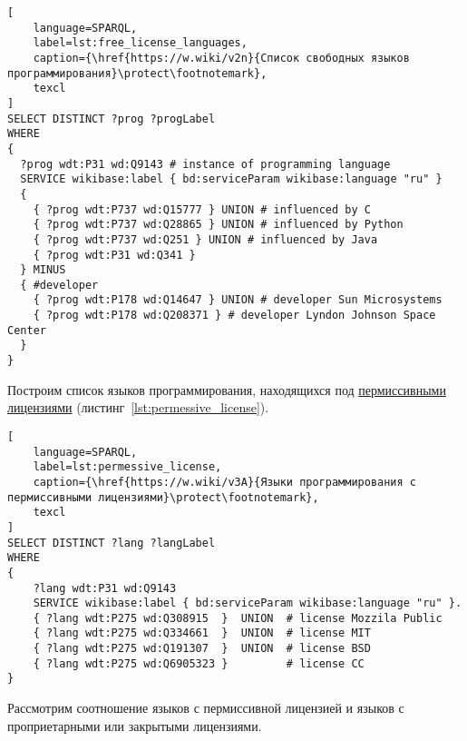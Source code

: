 \begin{lstlisting}[
	language=SPARQL,
	label=lst:free_license_languages,
	caption={\href{https://w.wiki/v2n}{Список свободных языков программирования}\protect\footnotemark},
	texcl
]
SELECT DISTINCT ?prog ?progLabel
WHERE
{
  ?prog wdt:P31 wd:Q9143 # instance of programming language
  SERVICE wikibase:label { bd:serviceParam wikibase:language "ru" } 
  {
    { ?prog wdt:P737 wd:Q15777 } UNION # influenced by C
    { ?prog wdt:P737 wd:Q28865 } UNION # influenced by Python
    { ?prog wdt:P737 wd:Q251 } UNION # influenced by Java
    { ?prog wdt:P31 wd:Q341 }
  } MINUS
  { #developer
    { ?prog wdt:P178 wd:Q14647 } UNION # developer Sun Microsystems
    { ?prog wdt:P178 wd:Q208371 } # developer Lyndon Johnson Space Center
  }
}
\end{lstlisting}

Построим список языков программирования, находящихся под \href{https://en.wikipedia.org/wiki/Permissive_software_license}{пермиссивными лицензиями} (листинг~\ref{lst:permessive_license}).
\begin{lstlisting}[
	language=SPARQL,
	label=lst:permessive_license,
	caption={\href{https://w.wiki/v3A}{Языки программирования с пермиссивными лицензиями}\protect\footnotemark},
	texcl
]
SELECT DISTINCT ?lang ?langLabel
WHERE
{
    ?lang wdt:P31 wd:Q9143
    SERVICE wikibase:label { bd:serviceParam wikibase:language "ru" }.
    { ?lang wdt:P275 wd:Q308915  }  UNION  # license Mozzila Public
    { ?lang wdt:P275 wd:Q334661  }  UNION  # license MIT
    { ?lang wdt:P275 wd:Q191307  }  UNION  # license BSD
    { ?lang wdt:P275 wd:Q6905323 }         # license CC
}
\end{lstlisting}
Рассмотрим соотношение языков с пермиссивной лицензией и языков с проприетарными или закрытыми лицензиями.

